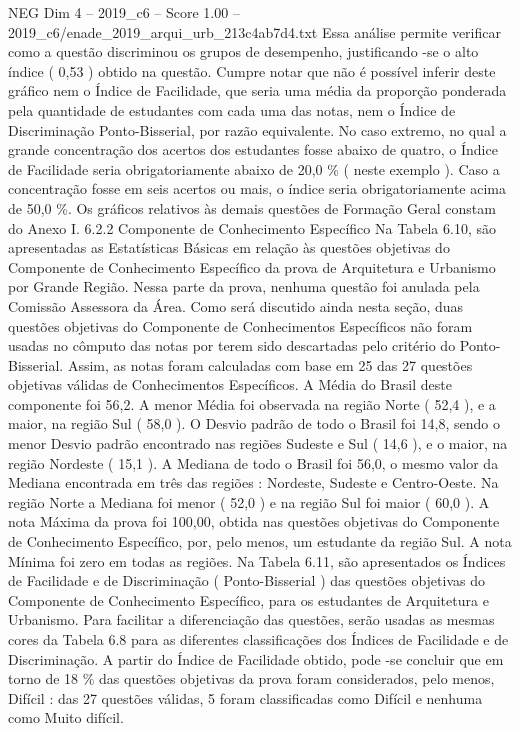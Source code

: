 \begin{textsample}{NEG Dim 4 – 2019\_c6 – Score 1.00 – 2019\_c6/enade\_2019\_arqui\_urb\_213c4ab7d4.txt}
Essa análise permite verificar como a questão discriminou os grupos de desempenho, justificando -se o alto índice ( 0,53 ) obtido na questão.
Cumpre notar que não é possível inferir deste gráfico nem o Índice de Facilidade, que seria uma média da proporção ponderada pela quantidade de estudantes com cada uma das notas, nem o Índice de Discriminação Ponto-Bisserial, por razão equivalente.
No caso extremo, no qual a grande concentração dos acertos dos estudantes fosse abaixo de quatro, o Índice de Facilidade seria obrigatoriamente abaixo de 20,0 \% ( neste exemplo ).
Caso a concentração fosse em seis acertos ou mais, o índice seria obrigatoriamente acima de 50,0 \%.
Os gráficos relativos às demais questões de Formação Geral constam do Anexo I. 6.2.2 Componente de Conhecimento Específico Na Tabela 6.10, são apresentadas as Estatísticas Básicas em relação às questões objetivas do Componente de Conhecimento Específico da prova de Arquitetura e Urbanismo por Grande Região.
Nessa parte da prova, nenhuma questão foi anulada pela Comissão Assessora da Área.
Como será discutido ainda nesta seção, duas questões objetivas do Componente de Conhecimentos Específicos não foram usadas no cômputo das notas por terem sido descartadas pelo critério do Ponto-Bisserial.
Assim, as notas foram calculadas com base em 25 das 27 questões objetivas válidas de Conhecimentos Específicos.
A Média do Brasil deste componente foi 56,2.
A menor Média foi observada na região Norte ( 52,4 ), e a maior, na região Sul ( 58,0 ).
O Desvio padrão de todo o Brasil foi 14,8, sendo o menor Desvio padrão encontrado nas regiões Sudeste e Sul ( 14,6 ), e o maior, na região Nordeste ( 15,1 ).
A Mediana de todo o Brasil foi 56,0, o mesmo valor da Mediana encontrada em três das regiões : Nordeste, Sudeste e Centro-Oeste.
Na região Norte a Mediana foi menor ( 52,0 ) e na região Sul foi maior ( 60,0 ).
A nota Máxima da prova foi 100,00, obtida nas questões objetivas do Componente de Conhecimento Específico, por, pelo menos, um estudante da região Sul.
A nota Mínima foi zero em todas as regiões.
Na Tabela 6.11, são apresentados os Índices de Facilidade e de Discriminação ( Ponto-Bisserial ) das questões objetivas do Componente de Conhecimento Específico, para os estudantes de Arquitetura e Urbanismo.
Para facilitar a diferenciação das questões, serão usadas as mesmas cores da Tabela 6.8 para as diferentes classificações dos Índices de Facilidade e de Discriminação.
A partir do Índice de Facilidade obtido, pode -se concluir que em torno de 18 \% das questões objetivas da prova foram considerados, pelo menos, Difícil : das 27 questões válidas, 5 foram classificadas como Difícil e nenhuma como Muito difícil.

\end{textsample}
